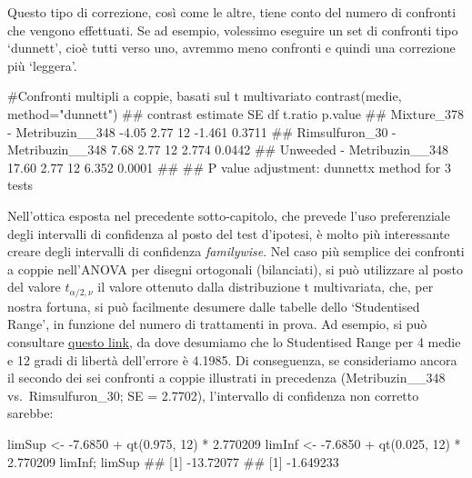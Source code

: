 \documentclass[a4paper,12pt,oneside]{book}
\newenvironment{Shaded}{}{}
\newcommand{\KeywordTok}[1]{#1}
\newcommand{\DataTypeTok}[1]{#1}
\newcommand{\DecValTok}[1]{#1}
\newcommand{\FloatTok}[1]{#1}
\newcommand{\StringTok}[1]{#1}
\newcommand{\CommentTok}[1]{#1}
\newcommand{\OperatorTok}[1]{#1}
\newcommand{\NormalTok}[1]{#1}
\begin{document}
Questo tipo di correzione, così come le altre, tiene conto del numero di confronti che vengono effettuati. Se ad esempio, volessimo eseguire un set di confronti tipo `dunnett', cioè tutti verso uno, avremmo meno confronti e quindi una correzione più `leggera'.

\begin{Shaded}
\begin{Highlighting}[]
\CommentTok{#Confronti multipli a coppie, basati sul t multivariato}
\KeywordTok{contrast}\NormalTok{(medie, }\DataTypeTok{method=}\StringTok{"dunnett"}\NormalTok{)}
\CommentTok{##  contrast                         estimate   SE df t.ratio p.value}
\CommentTok{##  Mixture_378 - Metribuzin__348       -4.05 2.77 12 -1.461  0.3711 }
\CommentTok{##  Rimsulfuron_30 - Metribuzin__348     7.68 2.77 12  2.774  0.0442 }
\CommentTok{##  Unweeded - Metribuzin__348          17.60 2.77 12  6.352  0.0001 }
\CommentTok{## }
\CommentTok{## P value adjustment: dunnettx method for 3 tests}
\end{Highlighting}
\end{Shaded}

Nell'ottica esposta nel precedente sotto-capitolo, che prevede l'uso preferenziale degli intervalli di confidenza al posto del test d'ipotesi, è molto più interessante creare degli intervalli di confidenza \emph{familywise}. Nel caso più semplice dei confronti a coppie nell'ANOVA per disegni ortogonali (bilanciati), si può utilizzare al posto del valore \(t_{\alpha/2, \nu}\) il valore ottenuto dalla distribuzione t multivariata, che, per nostra fortuna, si può facilmente desumere dalle tabelle dello `Studentised Range', in funzione del numero di trattamenti in prova. Ad esempio, si può consultare \href{http://davidmlane.com/hyperstat/sr_table.html}{questo link}, da dove desumiamo che lo Studentised Range per 4 medie e 12 gradi di libertà dell'errore è 4.1985. Di conseguenza, se consideriamo ancora il secondo dei sei confronti a coppie illustrati in precedenza (Metribuzin\_\_348 vs.~Rimsulfuron\_30; SE = 2.7702), l'intervallo di confidenza non corretto sarebbe:

\begin{Shaded}
\begin{Highlighting}[]
\NormalTok{limSup <-}\StringTok{ }\FloatTok{-7.6850} \OperatorTok{+}\StringTok{ }\KeywordTok{qt}\NormalTok{(}\FloatTok{0.975}\NormalTok{, }\DecValTok{12}\NormalTok{) }\OperatorTok{*}\StringTok{ }\FloatTok{2.770209}
\NormalTok{limInf <-}\StringTok{ }\FloatTok{-7.6850} \OperatorTok{+}\StringTok{ }\KeywordTok{qt}\NormalTok{(}\FloatTok{0.025}\NormalTok{, }\DecValTok{12}\NormalTok{) }\OperatorTok{*}\StringTok{ }\FloatTok{2.770209}
\NormalTok{limInf; limSup}
\CommentTok{## [1] -13.72077}
\CommentTok{## [1] -1.649233}
\end{Highlighting}
\end{Shaded}
\end{document}
